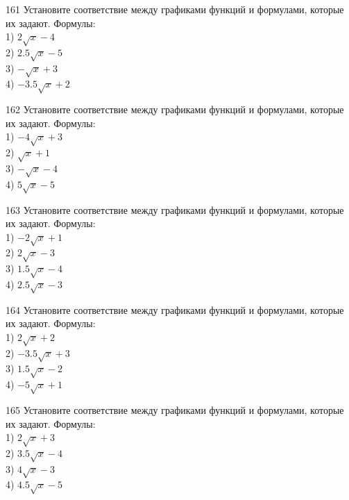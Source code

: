 \documentclass[4apaper]{article}
\begin{document}
\begin{taskBN}{161}
Установите соответствие между графиками функций и формулами, которые их задают. Формулы: \\1) $2\sqrt{x}-4$\\2) $2.5\sqrt{x}-5$\\3) $-\sqrt{x}+3$\\4) $-3.5\sqrt{x}+2$
\end{taskBN}

\begin{taskBN}{162}
Установите соответствие между графиками функций и формулами, которые их задают. Формулы: \\1) $-4\sqrt{x}+3$\\2) $\sqrt{x}+1$\\3) $-\sqrt{x}-4$\\4) $5\sqrt{x}-5$
\end{taskBN}

\begin{taskBN}{163}
Установите соответствие между графиками функций и формулами, которые их задают. Формулы: \\1) $-2\sqrt{x}+1$\\2) $2\sqrt{x}-3$\\3) $1.5\sqrt{x}-4$\\4) $2.5\sqrt{x}-3$
\end{taskBN}

\begin{taskBN}{164}
Установите соответствие между графиками функций и формулами, которые их задают. Формулы: \\1) $2\sqrt{x}+2$\\2) $-3.5\sqrt{x}+3$\\3) $1.5\sqrt{x}-2$\\4) $-5\sqrt{x}+1$
\end{taskBN}

\begin{taskBN}{165}
Установите соответствие между графиками функций и формулами, которые их задают. Формулы: \\1) $2\sqrt{x}+3$\\2) $3.5\sqrt{x}-4$\\3) $4\sqrt{x}-3$\\4) $4.5\sqrt{x}-5$
\end{taskBN}
\end{document}
